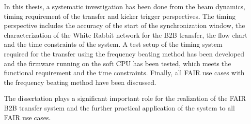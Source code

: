  
In this thesis, a systematic investigation has been done from the beam dynamics, timing requirement of the transfer and kicker trigger perspectives. The timing perspective includes the accuracy of the start of the synchronization window, the characterization of the White Rabbit network for the B2B transfer, the flow chart and the time constraints of the system. A test setup of the timing system required for the transfer using the frequency beating method has been developed and the firmware running on the soft CPU has been tested, which meets the functional requirement and the time constraints. Finally, all FAIR use cases with the frequency beating method have been discussed.

The dissertation plays a significant important role for the realization of the FAIR B2B transfer system and the further practical application of the system to all FAIR use cases.  




